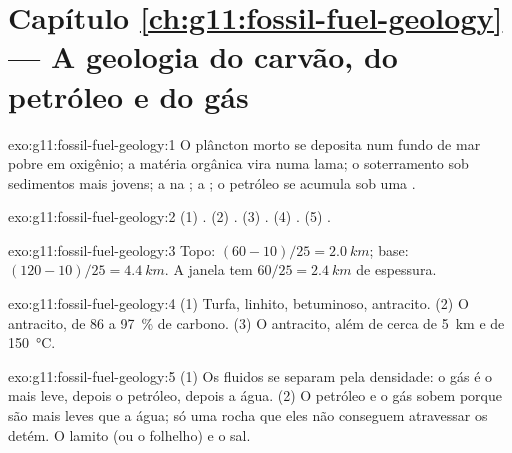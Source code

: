 \section*{Capítulo \ref{ch:g11:fossil-fuel-geology} --- A geologia do carvão, do petróleo e do gás}

\begin{solution}{exo:g11:fossil-fuel-geology:1}
O plâncton morto se deposita num fundo de mar pobre em oxigênio; a matéria
orgânica vira  numa lama; o soterramento sob sedimentos mais
jovens; a  na ; a ; o petróleo se acumula
sob uma .
\end{solution}

\begin{solution}{exo:g11:fossil-fuel-geology:2}
(1) . (2) . (3) . (4) . (5) .
\end{solution}

\begin{solution}{exo:g11:fossil-fuel-geology:3}
Topo: $(60 - 10)/25 = \qty{2.0}{km}$; base: $(120 - 10)/25 = \qty{4.4}{km}$.
A janela tem $60/25 = \qty{2.4}{km}$ de espessura.
\end{solution}

\begin{solution}{exo:g11:fossil-fuel-geology:4}
(1) Turfa, linhito,  betuminoso, antracito. (2) O antracito, de 86 a
\qty{97}{\percent} de carbono. (3) O antracito, além de cerca de
\qty{5}{km} e de \qty{150}{\degreeCelsius}.
\end{solution}

\begin{solution}{exo:g11:fossil-fuel-geology:5}
(1) Os fluidos se separam pela densidade: o gás é o mais leve, depois o
petróleo, depois a água. (2) O petróleo e o gás sobem porque são mais leves
que a água; só uma rocha que eles não conseguem atravessar os detém. O
lamito (ou o folhelho) e o sal.
\end{solution}

